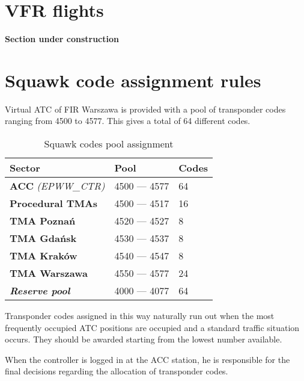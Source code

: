 \section{VFR flights}%
\begin{tcolorbox}[
    colback=orange!10!white,
    colframe=orange,
    title=\LARGE\textbf{Warning},
    before title={\faExclamationTriangle~}
]
    \textbf{Section under construction}
\end{tcolorbox}

\section{Squawk code assignment rules}%
\label{sect:airspace:squawks}

Virtual ATC of FIR Warszawa is provided with a pool of transponder codes ranging from 4500 to 4577. This gives a total of 64 different codes.

\begin{table}[htb]
    \centering
    \begin{tabular}{|l|l|l|}
        \rowcolor{vred}
        \color{white}\textbf Sector & \color{white}\textbf Pool & \color{white}\textbf Codes\\\hline
        \textbf{ACC} \textit{(EPWW\_CTR)} & 4500 --- 4577 & 64\\\hline
        \textbf{Procedural TMAs} & 4500 --- 4517 & 16 \\\hline
        \textbf{TMA Poznań} & 4520 --- 4527 & 8\\\hline
        \textbf{TMA Gdańsk} & 4530 --- 4537 & 8\\\hline
        \textbf{TMA Kraków} & 4540 --- 4547 & 8\\\hline
        \textbf{TMA Warszawa} & 4550 --- 4577 & 24\\\hline
        \textit{\textbf{Reserve pool}} & 4000 --- 4077 & 64\\\hline
    \end{tabular}
    \caption{Squawk codes pool assignment}
    \label{tbl:squawk}
\end{table}

Transponder codes assigned in this way naturally run out when the most frequently occupied ATC positions are occupied and a standard traffic situation occurs. They should be awarded starting from the lowest number available.

When the controller is logged in at the ACC station, he is responsible for the final decisions regarding the allocation of transponder codes.

